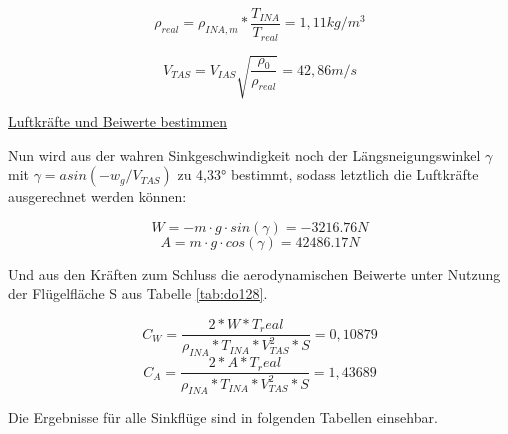 \vspace{5mm}

\begin{equation}
\rho_{real} = \rho_{INA,m} * \frac{T_{INA}}{T_{real}} = 1,11 kg/m^3
\end{equation}

\vspace{5mm}

\begin{equation}
V_{TAS} = V_{IAS}\sqrt{\frac{\rho_0}{\rho_{real}}} =42,86 m/s
\end{equation}


\vspace{5mm} \noindent
\underline{Luftkräfte und Beiwerte bestimmen}

\noindent Nun wird aus der wahren Sinkgeschwindigkeit noch der Längsneigungswinkel $\gamma$ mit $\gamma = asin(-w_g/V_{TAS})$ zu 4,33° bestimmt, sodass letztlich die Luftkräfte ausgerechnet werden können:

\begin{equation}
W = - m\cdot g \cdot sin(\gamma) = -3216.76 N
\end{equation}
\begin{equation}
A = m\cdot g \cdot cos(\gamma) = 42486.17 N
\end{equation}

\vspace{5mm} \noindent
Und aus den Kräften zum Schluss die aerodynamischen Beiwerte unter Nutzung der Flügelfläche S aus Tabelle \ref{tab:do128}.

\begin{equation}
C_W = \frac{2*W*T_real}{\rho_{INA} * T_{INA} * V_{TAS}^2 * S} = 0,10879
\end{equation}
\begin{equation}
C_A = \frac{2*A*T_real}{\rho_{INA} * T_{INA} * V_{TAS}^2 * S} = 1,43689
\end{equation}

\vspace{5mm} \noindent
Die Ergebnisse für alle Sinkflüge sind in folgenden Tabellen einsehbar.

